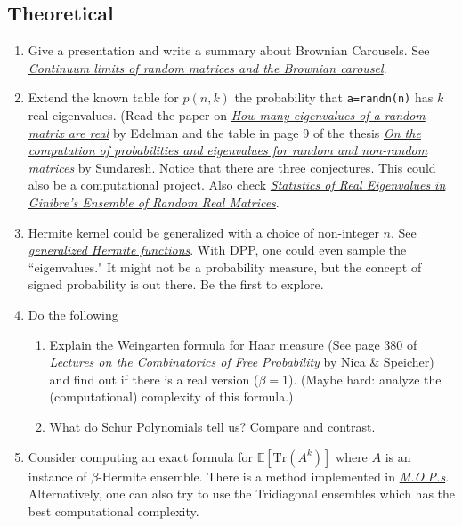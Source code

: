 \documentclass{article}
\begin{document}
\subsection*{Theoretical}
\begin{enumerate}
    \item Give a presentation and write a summary about Brownian Carousels. See \href{https://arxiv.org/pdf/0712.2000.pdf}{\emph{\color{blue}Continuum limits of random matrices and the Brownian carousel}}. 
    \item Extend the known table for $p(n,k)$ the probability that \texttt{a=randn(n)} has $k$ real eigenvalues. (Read the paper on \href{http://www-math.mit.edu/~edelman/homepage/papers/howmany.pdf}{\emph{\color{blue}How many eigenvalues of a random matrix are real}} by Edelman and the table in page 9 of the thesis \href{http://dspace.mit.edu/bitstream/handle/1721.1/54840/587445752.pdf?sequence=1}{\emph{\color{blue}On the computation of probabilities and eigenvalues for random and non-random matrices}} by Sundaresh. Notice that there are three conjectures. This could also be a computational project. Also check \href{http://prl.aps.org/pdf/PRL/v95/i23/e230201}{\emph{\color{blue}Statistics of Real Eigenvalues in Ginibre’s Ensemble of Random Real Matrices}}.
    \item Hermite kernel could be generalized with a choice of non-integer $n$. See \href{https://functions.wolfram.com/HypergeometricFunctions/HermiteHGeneral/02/}{\emph{\color{blue}generalized Hermite functions}}. With DPP, one could even sample the ``eigenvalues." It might not be a probability measure, but the concept of signed probability is out there. Be the first to explore.
    \item Do the following
    \begin{enumerate}
        \item Explain the Weingarten formula for Haar measure (See page 380 of \emph{Lectures on the Combinatorics of Free Probability} by  Nica \& Speicher) and  find out if there is a real version ($\beta = 1$). (Maybe hard: analyze the (computational) complexity of this formula.)
        \item What do Schur Polynomials tell us? Compare and contrast.
    \end{enumerate}
    \item Consider computing an exact formula for $\mathbb{E}[\text{Tr}(A^k)]$ where $A$ is an instance of $\beta$-Hermite ensemble. There is a method implemented in \href{https://arxiv.org/pdf/math-ph/0409066.pdf}{\emph{\color{blue}M.O.P.s}}. Alternatively, one can also try to use the Tridiagonal ensembles which has the best computational complexity.

\end{enumerate}
\end{document}
